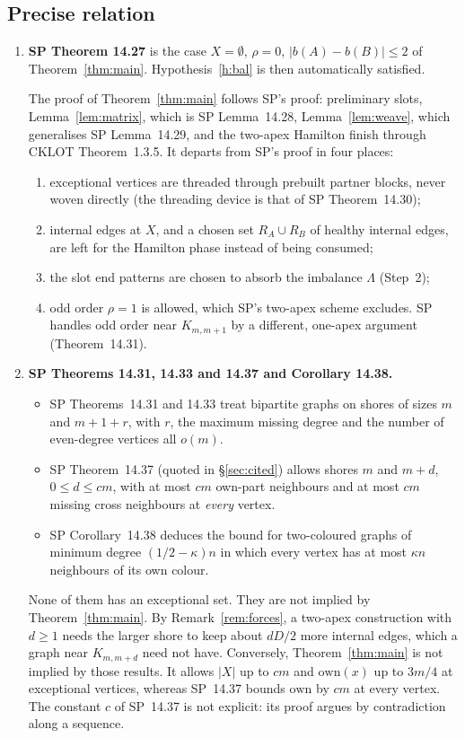 \documentclass[11pt]{article}
\theoremstyle{definition}
\newcommand{\own}{\mathrm{own}}
\begin{document}
\subsection{Precise relation}
\begin{enumerate}[label=(\arabic*)]
\item \textbf{SP Theorem 14.27} is the case $X=\emptyset$, $\rho=0$, $|b(A)-b(B)|\le2$ of Theorem~\ref{thm:main}. Hypothesis~\ref{h:bal} is then automatically satisfied.

The proof of Theorem~\ref{thm:main} follows SP's proof: preliminary slots, Lemma~\ref{lem:matrix}, which is SP Lemma~14.28, Lemma~\ref{lem:weave}, which generalises SP Lemma~14.29, and the two-apex Hamilton finish through CKLOT Theorem~1.3.5. It departs from SP's proof in four places:
\begin{enumerate}[label=(\alph*),nosep]
\item exceptional vertices are threaded through prebuilt partner blocks, never woven directly (the threading device is that of SP Theorem~14.30);
\item internal edges at $X$, and a chosen set $R_A\cup R_B$ of healthy internal edges, are left for the Hamilton phase instead of being consumed;
\item the slot end patterns are chosen to absorb the imbalance $\Lambda$ (Step~2);
\item odd order $\rho=1$ is allowed, which SP's two-apex scheme excludes. SP handles odd order near $K_{m,m+1}$ by a different, one-apex argument (Theorem~14.31).
\end{enumerate}
\item \textbf{SP Theorems 14.31, 14.33 and 14.37 and Corollary 14.38.}
\begin{itemize}[nosep]
\item SP Theorems~14.31 and 14.33 treat bipartite graphs on shores of sizes $m$ and $m+1+r$, with $r$, the maximum missing degree and the number of even-degree vertices all $o(m)$.
\item SP Theorem~14.37 (quoted in \S\ref{sec:cited}) allows shores $m$ and $m+d$, $0\le d\le cm$, with at most $cm$ own-part neighbours and at most $cm$ missing cross neighbours at \emph{every} vertex.
\item SP Corollary~14.38 deduces the bound for two-coloured graphs of minimum degree $(1/2-\kappa)n$ in which every vertex has at most $\kappa n$ neighbours of its own colour.
\end{itemize}
None of them has an exceptional set. They are not implied by Theorem~\ref{thm:main}. By Remark~\ref{rem:forces}, a two-apex construction with $d\ge1$ needs the larger shore to keep about $dD/2$ more internal edges, which a graph near $K_{m,m+d}$ need not have. Conversely, Theorem~\ref{thm:main} is not implied by those results. It allows $|X|$ up to $cm$ and $\own(x)$ up to $3m/4$ at exceptional vertices, whereas SP~14.37 bounds $\own$ by $cm$ at every vertex. The constant $c$ of SP~14.37 is not explicit: its proof argues by contradiction along a sequence.

\end{enumerate}
\end{document}
